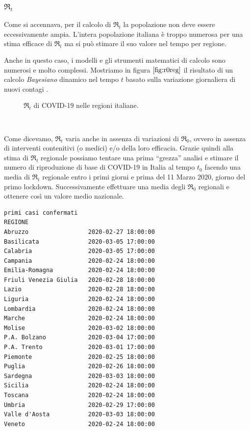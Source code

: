 \documentclass[11pt]{article}
\begin{document}
    \hypertarget{re_t}{%
\subsubsection{\texorpdfstring{\(\Re_t\)}{\textbackslash Re\_t}}\label{re_t}}

    Come si accennava, per il calcolo di \(\Re_t\) la popolazione non deve
essere eccessivamente ampia. L'intera popolazione italiana è troppo
numerosa per una stima efficace di \(\Re_t\) ma si può stimare il suo
valore nel tempo per regione.

Anche in questo caso, i modelli e gli strumenti matematici di calcolo
sono numerosi e molto complessi. Mostriamo in figura \(\ref{fig:r0reg}\) il risultato di un
calcolo \emph{Bayesiano} dinamico nel tempo \(t\) basato sulla
variazione giornaliera di nuovi contagi \cite{k-sys}
\cite{bettencourt_ribeiro_2008}.

    \begin{figure}
    \caption{\(\Re_t\) di COVID-19 nelle regioni italiane.}
    \label{fig:r0reg}
    \end{figure}
    { \hspace*{\fill} \\}
    
    Come dicevamo, \(\Re_t\) varia anche in assenza di variazioni di
\(\Re_0\), ovvero in assenza di interventi contenitivi (o medici) e/o
della loro efficacia. Grazie quindi alla stima di \(\Re_t\) regionale
possiamo tentare una prima ``grezza'' analisi e stimare il numero di
riproduzione di base di COVID-19 in Italia al tempo \(t_0\) facendo una
media di \(\Re_t\) regionale entro i primi giorni e prima del 11 Marzo
2020, giorno del primo lockdown. Successivamente effettuare una media
degli \(\Re_0\) regionali e ottenere così un valore medio nazionale.

    \begin{Verbatim}[commandchars=\\\{\}]
                      primi casi confermati
REGIONE
Abruzzo                 2020-02-27 18:00:00
Basilicata              2020-03-05 17:00:00
Calabria                2020-03-05 17:00:00
Campania                2020-02-24 18:00:00
Emilia-Romagna          2020-02-24 18:00:00
Friuli Venezia Giulia   2020-02-28 18:00:00
Lazio                   2020-02-28 18:00:00
Liguria                 2020-02-24 18:00:00
Lombardia               2020-02-24 18:00:00
Marche                  2020-02-24 18:00:00
Molise                  2020-03-02 18:00:00
P.A. Bolzano            2020-03-04 17:00:00
P.A. Trento             2020-03-01 17:00:00
Piemonte                2020-02-25 18:00:00
Puglia                  2020-02-26 18:00:00
Sardegna                2020-03-03 18:00:00
Sicilia                 2020-02-24 18:00:00
Toscana                 2020-02-24 18:00:00
Umbria                  2020-02-29 17:00:00
Valle d'Aosta           2020-03-03 18:00:00
Veneto                  2020-02-24 18:00:00
    \end{Verbatim}
\end{document}
